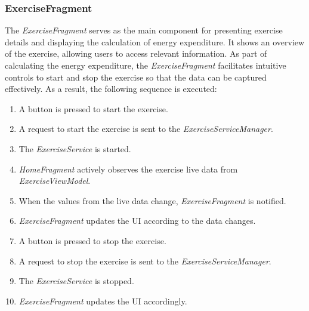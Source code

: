 \subsubsection{ExerciseFragment}
The \emph{ExerciseFragment} serves as the main component for presenting exercise details and displaying the calculation of energy expenditure. 
It shows an overview of the exercise, allowing users to access relevant information.
As part of calculating the energy expenditure, the \emph{ExerciseFragment} facilitates intuitive controls to start and stop the exercise so that the data can be captured effectively. As a result, the following sequence is executed:

\begin{enumerate}
    \item A button is pressed to start the exercise.
    \item A request to start the exercise is sent to the \emph{ExerciseServiceManager}.
    \item The \emph{ExerciseService} is started.
    \item \emph{HomeFragment} actively observes the exercise live data from \emph{ExerciseViewModel}.
    \item When the values from the live data change, \emph{ExerciseFragment} is notified.
    \item \emph{ExerciseFragment} updates the UI according to the data changes.
    \item A button is pressed to stop the exercise.
    \item A request to stop the exercise is sent to the \emph{ExerciseServiceManager}.
    \item The \emph{ExerciseService} is stopped.
    \item \emph{ExerciseFragment} updates the UI accordingly.
\end{enumerate}

